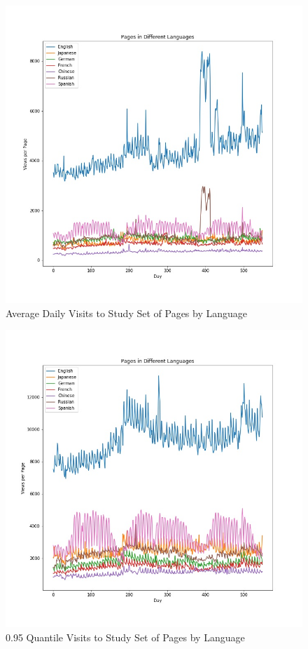 \documentclass[conference]{IEEEtran}
\begin{document}
\begin{figure}[htbp]
\centering
\includegraphics[scale=.25]{average_use.jpg}
\caption{Average Daily Visits to Study Set of Pages by Language}
\label{average_use}
\end{figure}

\begin{figure}[htbp]
\centering
\includegraphics[scale=.25]{quantile95_use.jpg}
\caption{0.95 Quantile Visits to Study Set of Pages by Language}
\label{95_tile}
\end{figure}
\end{document}
